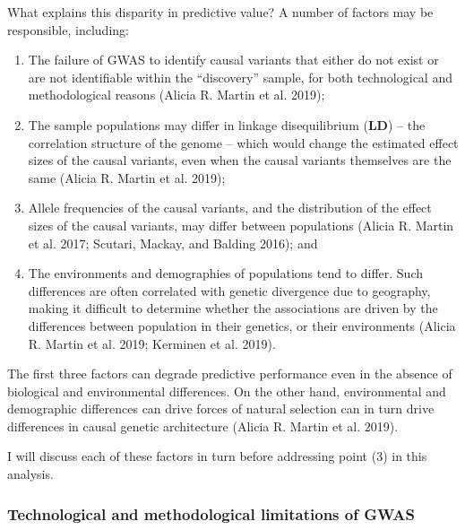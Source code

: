 \documentclass[
]{book}
\begin{document}
What explains this disparity in predictive value? A number of factors may be responsible, including:

\begin{enumerate}
\def\labelenumi{\arabic{enumi}.}
\item
  The failure of GWAS to identify causal variants that either do not exist or are not identifiable within the ``discovery'' sample, for both technological and methodological reasons (Alicia R. Martin et al. 2019);
\item
  The sample populations may differ in linkage disequilibrium (\textbf{LD}) -- the correlation structure of the genome -- which would change the estimated effect sizes of the causal variants, even when the causal variants themselves are the same (Alicia R. Martin et al. 2019);
\item
  Allele frequencies of the causal variants, and the distribution of the effect sizes of the causal variants, may differ between populations (Alicia R. Martin et al. 2017; Scutari, Mackay, and Balding 2016); and
\item
  The environments and demographies of populations tend to differ. Such differences are often correlated with genetic divergence due to geography, making it difficult to determine whether the associations are driven by the differences between population in their genetics, or their environments (Alicia R. Martin et al. 2019; Kerminen et al. 2019).
\end{enumerate}

The first three factors can degrade predictive performance even in the absence of biological and environmental differences. On the other hand, environmental and demographic differences can drive forces of natural selection can in turn drive differences in causal genetic architecture (Alicia R. Martin et al. 2019).

I will discuss each of these factors in turn before addressing point (3) in this analysis.

\hypertarget{fst-discovery-sec}{%
\subsubsection{Technological and methodological limitations of GWAS}\label{fst-discovery-sec}}
\end{document}

